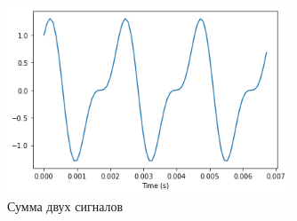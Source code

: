 \documentclass[a4paper, 12pt]{report}
\begin{document}
	\begin{figure}[H]
		\centering
		\includegraphics[width=0.75\textwidth]{mix.png}
		\caption{Сумма двух сигналов}
		\label{fig:mix}
	\end{figure}
	
\end{document}
